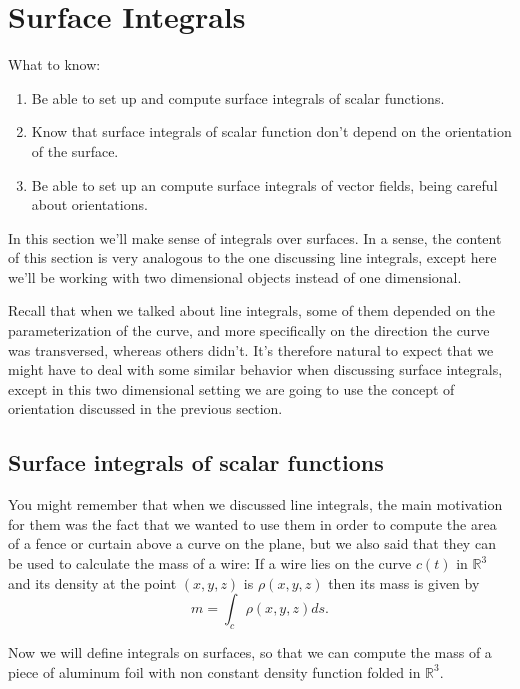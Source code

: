 \documentclass[12pt]{article}
\title{}
\newcommand{\R}{ \mathbb{R}}
\begin{document}
\section*{Surface Integrals}

What to know:
\begin{enumerate}
\item Be able to set up and compute surface integrals of scalar functions.
\item Know that surface integrals of scalar function don't depend on the orientation of the surface.
\item Be able to set up an compute surface integrals of vector fields, being careful about orientations.
\end{enumerate}





In this section we'll make sense of integrals over surfaces. In a sense, the content of this section is very analogous to the one discussing line integrals, except here we'll be working with two dimensional objects instead of one dimensional.

Recall that when we talked about line integrals, some of them depended on the parameterization of the curve, and more specifically on the direction the curve was transversed, whereas others didn't. It's therefore natural to expect that we might have to deal with some similar behavior when discussing surface integrals, except in this two dimensional setting we are going to use the concept of orientation discussed in the previous section.

\subsection*{Surface integrals of scalar functions}
You might remember that when we discussed line integrals, the main motivation for them was the fact that we wanted to use them in order to compute the area of a fence or curtain above a curve on the plane, but we also said that they can be used to calculate the mass of a wire: If a wire lies on the curve $c(t)$ in $\R^3$ and its density at the point $(x,y,z)$ is $\rho(x,y,z)$ then its mass is given by $$m=\int_c \rho(x,y,z)ds.$$


Now we will define integrals on surfaces, so that we can compute the mass of a piece of aluminum foil with non constant density function folded in $\R^3$.
\end{document}
